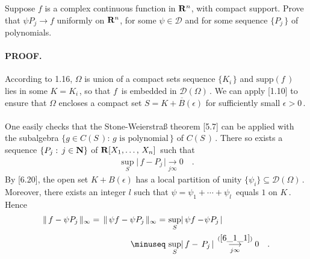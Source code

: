 {\CMUCS Suppose $f$ is a complex continuous function in ${\mathbf R}^n$, with compact support. \!\!Prove that $\psi P_j\to \!f$ uniformly on ${\mathbf R}^n$, for some $\psi\in \mathscr{D}$ and for some sequence $\{P_j\,\}$ of polynomials.}
\paragraph{PROOF.} According to 1.16, $\Omega$ is union of a compact sets sequence $\{K_{i\,}\}$ and $\text{supp} (f\,)$ lies in some $K= K_{i\,}$, so that $f\,$ is embedded in $\mathscr{D}(\Omega)\,$. We can apply [1.10] to ensure that $\Omega$ encloses a compact set $S=\overline{K +B(\epsilon)}$ for sufficiently small $\epsilon>0\,$.\\
\\
One easily checks that the Stone-Weierstraß theorem [5.7] can be applied with the subalgebra $ \{ g\in C(S\,) :\, g \text{ is polynomial}\,\}$ of $C(S\,)\,$.
There so exists a sequence $\{P_j:\, j\in {\mathbf N}\}$ of ${\mathbf R}[X_1,\dotsc,\, X_n]\,$ such that 
\begin{align}\label{6_1_1}
\sup_S \lvert\, f-P_{j\,} \rvert  \underset{j\infty}{\longrightarrow} 0\quad.
\end{align} 
 By [6.20], the open set $K +B(\epsilon)$ has a local partition of unity $\{\psi_i\}\subseteq \mathscr{D}(\Omega)\,$. Moreover, there exists an integer $l$ such that $\psi=\psi_1+\dotsb+\psi_l\,$ equals $1$ on $K\,$. Hence
\begin{align}\label{6_1_2}
\| \, f - \psi P_{j\,}\|_\infty=  \, \|  \,\psi f - \psi P_{j\,}\|_\infty 
=  &  \, \sup_S  \lvert \, \psi f -\! \psi P_{j\,}\rvert  \\
   \minuseq  &  \,   \sup_S  \lvert  \, f -  \, P_{j\,} \rvert    \, \overset{(\ref{6_1_1})}{\underset{j\infty}{\longrightarrow}} 0\quad .
\end{align} 
\QED
